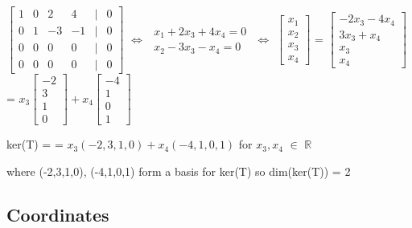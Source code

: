 \begin{tbox}
        \hspace{0.5cm}
        $\begin{bmatrix}
            1 & 0 & 2 & 4 & | & 0 \\
            0 & 1 & -3 & -1 & | & 0 \\
            0 & 0 & 0 & 0 & | & 0 \\
            0 & 0 & 0 & 0 & | & 0
        \end{bmatrix}$
        \hspace{0.2cm}
        $\Leftrightarrow$
        \hspace{0.2cm}
        $\begin{matrix*}
            x_1 + 2x_3 + 4x_4 = 0 \\
            x_2 - 3x_3 - x_4 = 0
        \end{matrix*}$
        \hspace{0.2cm}
        $\Leftrightarrow$
        \hspace{0.2cm}
        $\begin{bmatrix}
            x_1 \\
            x_2 \\
            x_3 \\
            x_4
        \end{bmatrix}$ =
        $\begin{bmatrix}
            -2x_3 - 4x_4 \\
            3x_3 + x_4 \\
            x_3 \\
            x_4 
        \end{bmatrix}$ =
        $x_3\begin{bmatrix}
                -2 \\
                3 \\
                1 \\
                0    
            \end{bmatrix} +
        x_4\begin{bmatrix}
                -4 \\
                1 \\
                0 \\
                1    
            \end{bmatrix}$
        
        \hspace{0.5cm}
        ker(T) =
        = $x_3(-2,3,1,0) + x_4(-4,1,0,1)$
        \hspace{0.5cm}
        for $x_3,x_4$ $\in$ $\mathbb{R}$
        
        \hspace{0.5cm}
        where (-2,3,1,0), (-4,1,0,1) form a basis for ker(T) so dim(ker(T)) = 2
    \end{tbox}

    \vspace{0.5cm}





\subsection{ Coordinates }
















